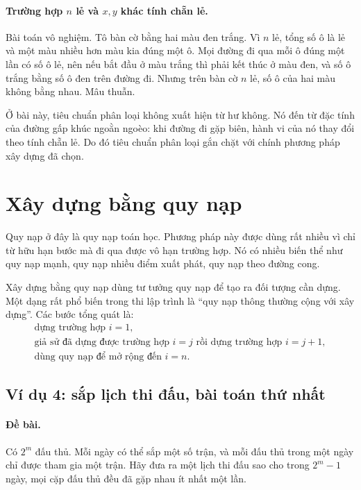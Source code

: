 \documentclass[11pt]{article}
\begin{document}
\paragraph{Trường hợp $n$ lẻ và $x,y$ khác tính chẵn lẻ.}
Bài toán vô nghiệm. Tô bàn cờ bằng hai màu đen trắng. Vì $n$ lẻ, tổng số ô là
lẻ và một màu nhiều hơn màu kia đúng một ô. Mọi đường đi qua mỗi ô đúng một
lần có số ô lẻ, nên nếu bắt đầu ở màu trắng thì phải kết thúc ở màu đen, và
số ô trắng bằng số ô đen trên đường đi. Nhưng trên bàn cờ $n$ lẻ, số ô của
hai màu không bằng nhau. Mâu thuẫn.

Ở bài này, tiêu chuẩn phân loại không xuất hiện từ hư không. Nó đến từ đặc
tính của đường gấp khúc ngoằn ngoèo: khi đường đi gặp biên, hành vi của nó
thay đổi theo tính chẵn lẻ. Do đó tiêu chuẩn phân loại gắn chặt với chính
phương pháp xây dựng đã chọn.

\section{Xây dựng bằng quy nạp}

Quy nạp ở đây là quy nạp toán học. Phương pháp này được dùng rất nhiều vì chỉ
từ hữu hạn bước mà đi qua được vô hạn trường hợp. Nó có nhiều biến thể như quy
nạp mạnh, quy nạp nhiều điểm xuất phát, quy nạp theo đường cong.

Xây dựng bằng quy nạp dùng tư tưởng quy nạp để tạo ra đối tượng cần dựng. Một
dạng rất phổ biến trong thi lập trình là ``quy nạp thông thường cộng với xây
dựng''. Các bước tổng quát là:
\[
\begin{array}{c}
\text{dựng trường hợp } i=1,\\[0.3em]
\text{giả sử đã dựng được trường hợp } i=j
\text{ rồi dựng trường hợp } i=j+1,\\[0.3em]
\text{dùng quy nạp để mở rộng đến } i=n.
\end{array}
\]

\subsection{Ví dụ 4: sắp lịch thi đấu, bài toán thứ nhất}

\paragraph{Đề bài.}
Có $2^m$ đấu thủ. Mỗi ngày có thể sắp một số trận, và mỗi đấu thủ trong một
ngày chỉ được tham gia một trận. Hãy đưa ra một lịch thi đấu sao cho trong
$2^m-1$ ngày, mọi cặp đấu thủ đều đã gặp nhau ít nhất một lần.
\end{document}
